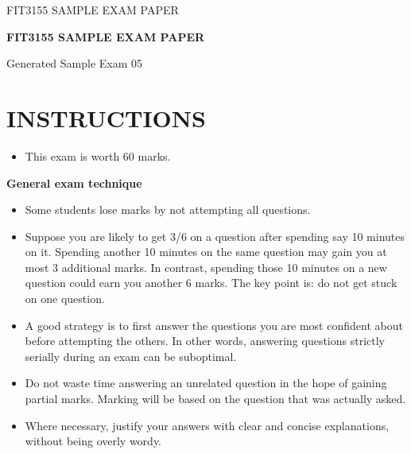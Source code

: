 \documentclass[12pt,letterpaper]{article}
\begin{document}
\begin{titlepage}
  \thispagestyle{empty}
  \vspace*{0.18\textheight}
  {\Large FIT3155 \hfill SAMPLE EXAM PAPER\par}
  \vspace{2.2cm}
  \begin{center}
    {\LARGE\bfseries FIT3155 SAMPLE EXAM PAPER\par}
    \vspace{0.8cm}
    {\large Generated Sample Exam 05\par}
  \end{center}
\end{titlepage}

\setcounter{page}{2}

\section*{INSTRUCTIONS}

\begin{itemize}
  \item This exam is worth 60 marks.
\end{itemize}

\begin{center}
  \textbf{General exam technique}
\end{center}

\begin{itemize}
  \item Some students lose marks by not attempting all questions.

  \item Suppose you are likely to get 3/6 on a question after spending say 10 minutes on it.
  Spending another 10 minutes on the same question may gain you at most 3 additional
  marks. In contrast, spending those 10 minutes on a new question could earn you another
  6 marks. The key point is: do not get stuck on one question.

  \item A good strategy is to first answer the questions you are most confident about before
  attempting the others. In other words, answering questions strictly serially during an
  exam can be suboptimal.

  \item Do not waste time answering an unrelated question in the hope of gaining partial marks.
  Marking will be based on the question that was actually asked.

  \item Where necessary, justify your answers with clear and concise explanations, without being
  overly wordy.
\end{itemize}
\end{document}

